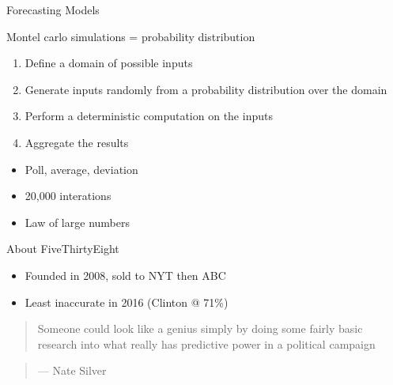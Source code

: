 \documentclass[ignorenonframetext,]{beamer}
\providecommand{\tightlist}{%
  \setlength{\itemsep}{0pt}\setlength{\parskip}{0pt}}
\begin{document}
\begin{frame}{Forecasting Models}

Montel carlo simulations = probability distribution

\begin{enumerate}
\def\labelenumi{\arabic{enumi}.}
\tightlist
\item
  Define a domain of possible inputs
\item
  Generate inputs randomly from a probability distribution over the
  domain
\item
  Perform a deterministic computation on the inputs
\item
  Aggregate the results
\end{enumerate}

\begin{itemize}
\tightlist
\item
  Poll, average, deviation
\item
  20,000 interations
\item
  Law of large numbers
\end{itemize}

\end{frame}

\begin{frame}{About FiveThirtyEight}

\begin{itemize}
\tightlist
\item
  Founded in 2008, sold to NYT then ABC
\item
  Least inaccurate in 2016 (Clinton @ 71\%)
\end{itemize}

\begin{quote}
Someone could look like a genius simply by doing some fairly basic
research into what really has predictive power in a political campaign
\end{quote}

\begin{quote}
--- Nate Silver
\end{quote}

\end{frame}
\end{document}
